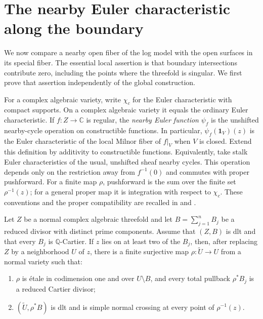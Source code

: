 \section{The nearby Euler characteristic along the boundary}
\label{sec:nearby-euler}

We now compare a nearby open fiber of the log model with the open
surfaces in its special fiber.  The essential local assertion is that
boundary intersections contribute zero, including the points where the
threefold is singular.  We first prove that assertion independently of
the global construction.

For a complex algebraic variety, write $\chi_c$ for the Euler
characteristic with compact supports.  On a complex algebraic variety it
equals the ordinary Euler characteristic.  If $f:Z\to\mathbb C$ is
regular, the \emph{nearby Euler function} $\psi_f$ is the unshifted
nearby-cycle operation on constructible functions.  In particular,
$\psi_f(\mathbf1_V)(z)$ is the Euler characteristic of the local Milnor
fiber of $f|_V$ when $V$ is closed.  Extend this definition by additivity
to constructible functions.  Equivalently, take stalk Euler
characteristics of the usual, unshifted sheaf nearby cycles.  This
operation depends only on the restriction away from $f^{-1}(0)$ and
commutes with proper pushforward.  For a finite map $\rho$, pushforward
is the sum over the finite set $\rho^{-1}(z)$; for a general proper map it
is integration with respect to $\chi_c$.  These conventions and the
proper compatibility are recalled in
\cite[Definition~3.2]{SchuermannNearby} and
\cite[Proposition~4.19(1)]{MaximSchuermann}.

\begin{lemma}
\label{lem:boundary-cover}
Let $Z$ be a normal complex algebraic threefold and let
$B=\sum_{j=1}^n B_j$ be a reduced divisor with distinct prime components.
Assume that $(Z,B)$ is dlt and that every $B_j$ is $\mathbb Q$-Cartier.
If $z$ lies on at least two of the $B_j$, then, after replacing $Z$ by a
neighborhood $U$ of $z$, there is a finite surjective map
$\rho:\widetilde U\to U$ from a normal variety such that:
\begin{enumerate}
\item $\rho$ is \'etale in codimension one and over
      $U\setminus B$, and every total pullback $\rho^*B_j$ is a reduced
      Cartier divisor;
\item $(\widetilde U,\rho^*B)$ is dlt and is simple normal crossing at
      every point of $\rho^{-1}(z)$.
\end{enumerate}
\end{lemma}

